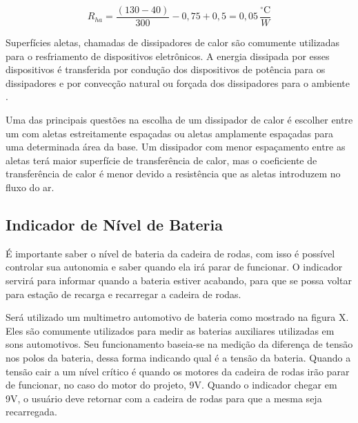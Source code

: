 \begin{equation}
 R_{ha} = \frac{(130 - 40)}{300} - 0,75 + 0,5 = 0,05\,\frac{^{\circ}\mathrm{C}}{{W}}
\end{equation}

Superfícies aletas, chamadas de dissipadores de calor são
comumente utilizadas para o resfriamento de dispositivos eletrônicos. A energia dissipada por
esses dispositivos é transferida por condução dos dispositivos de potência para os dissipadores
e por convecção natural ou forçada dos dissipadores para o ambiente \cite[p.~434-439]{cengel}.

Uma das principais questões na escolha de um dissipador de calor é escolher entre um com
aletas estreitamente espaçadas ou aletas amplamente espaçadas para uma determinada área
da base. Um dissipador com menor espaçamento entre as aletas terá maior superfície de
transferência de calor, mas o coeficiente de transferência de calor é menor devido a
resistência que as aletas introduzem no fluxo do ar.

\subsection{Indicador de Nível de Bateria}

É importante saber o nível de bateria da cadeira de rodas, com isso é possível controlar sua autonomia e saber quando ela irá parar de funcionar. O indicador servirá para informar quando a bateria estiver acabando, para que se possa voltar para estação de recarga e recarregar a cadeira de rodas.

Será utilizado um multimetro automotivo de bateria como mostrado na figura X. Eles são comumente utilizados para medir as baterias auxiliares utilizadas em sons automotivos. Seu funcionamento baseia-se na medição da diferença de tensão nos polos da bateria, dessa forma indicando qual é a tensão da bateria. Quando a tensão cair a um nível crítico é quando os motores da cadeira de rodas irão parar de funcionar, no caso do motor do projeto, 9V. Quando o indicador chegar em 9V, o usuário deve retornar com a cadeira de rodas para que a mesma seja recarregada.
